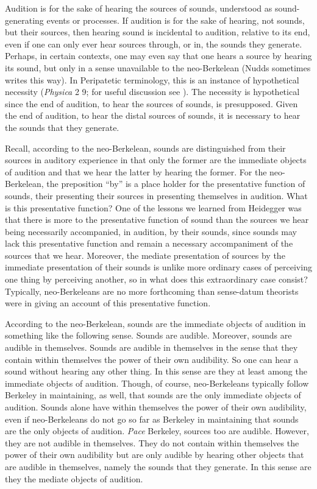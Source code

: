 Audition is for the sake of hearing the sources of sounds, understood as sound-generating events or processes. If audition is for the sake of hearing, not sounds, but their sources, then hearing sound is incidental to audition, relative to its end, even if one can only ever hear sources through, or in, the sounds they generate. Perhaps, in certain contexts, one may even say that one hears a source by hearing its sound, but only in a sense unavailable to the neo-Berkelean (Nudds sometimes writes this way). In Peripatetic terminology, this is an instance of hypothetical necessity (\emph{Physica} 2 9; for useful discussion see \citealt{Charles:1988as}). The necessity is hypothetical since the end of audition, to hear the sources of sounds, is presupposed. Given the end of audition, to hear the distal sources of sounds, it is necessary to hear the sounds that they generate.

Recall, according to the neo-Berkelean, sounds are distinguished from their sources in auditory experience in that only the former are the immediate objects of audition and that we hear the latter by hearing the former. For the neo-Berkelean, the preposition ``by'' is a place holder for the presentative function of sounds, their presenting their sources in presenting themselves in audition. What is this presentative function? One of the lessons we learned from Heidegger was that there is more to the presentative function of sound than the sources we hear being necessarily accompanied, in audition, by their sounds, since sounds may lack this presentative function and remain a necessary accompaniment of the sources that we hear. Moreover, the mediate presentation of sources by the immediate presentation of their sounds is unlike more ordinary cases of perceiving one thing by perceiving another, so in what does this extraordinary case consist? Typically, neo-Berkeleans are no more forthcoming than sense-datum theorists were in giving an account of this presentative function.

According to the neo-Berkelean, sounds are the immediate objects of audition in something like the following sense. Sounds are audible. Moreover, sounds are audible in themselves. Sounds are audible in themselves in the sense that they contain within themselves the power of their own audibility. So one can hear a sound without hearing any other thing. In this sense are they at least among the immediate objects of audition. Though, of course, neo-Berkeleans typically follow Berkeley in maintaining, as well, that sounds are the only immediate objects of audition. Sounds alone have within themselves the power of their own audibility, even if neo-Berkeleans do not go so far as Berkeley in maintaining that sounds are the only objects of audition. \emph{Pace} Berkeley, sources too are audible. However, they are not audible in themselves. They do not contain within themselves the power of their own audibility but are only audible by hearing other objects that are audible in themselves, namely the sounds that they generate. In this sense are they the mediate objects of audition.

